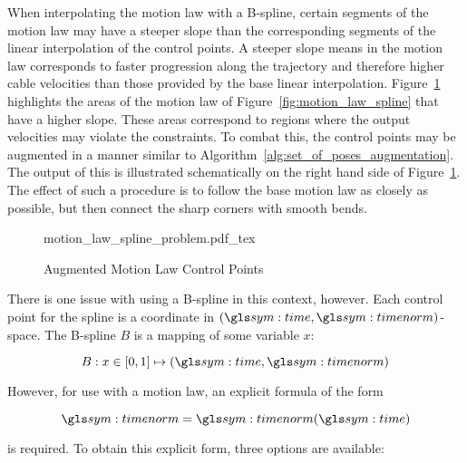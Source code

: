 	When interpolating the motion law with a B-spline, certain segments of the
	motion law may have a steeper slope than the corresponding segments of the
	linear interpolation of the control points. A steeper slope means in the
	motion law corresponds to faster progression along the trajectory and
	therefore higher cable velocities than those provided by the base linear
	interpolation.  Figure~\ref{fig:augmented_motion_law_control_points}
	highlights the areas of the motion law of Figure~\ref{fig:motion_law_spline}
	that have a higher slope. These areas correspond to regions where the output
	velocities may violate the constraints. To combat this, the control points
	may be augmented in a manner similar to
	Algorithm~\ref{alg:set_of_poses_augmentation}. The output of this is
	illustrated schematically on the right hand side of
	Figure~\ref{fig:augmented_motion_law_control_points}. The effect of such a
	procedure is to follow the base motion law as closely as possible, but then
	connect the sharp corners with smooth bends.

	\begin{figure}[hb]
		\centering
		\def\svgwidth{\textwidth}
		{motion_law_spline_problem.pdf_tex}
		\caption{Augmented Motion Law Control Points}%
		\label{fig:augmented_motion_law_control_points}
	\end{figure}

	There is one issue with using a B-spline in this context, however. Each
	control point for the spline is a coordinate in
	\(
		\left(
			\timesym, \timenorm
		\right)
	\)-space. The B-spline $B$ is a mapping of some variable $x$:

	\begin{equation}
		B: x \in [0, 1] \mapsto \left(\timesym, \timenorm\right)
	\end{equation}

	However, for use with a motion law, an explicit formula of the form

	\begin{equation}
		\timenorm = \timenorm(\timesym)
		\label{eq:direct_relation_motion_law_spline}
	\end{equation}

	is required. To obtain this explicit form, three options are available:

